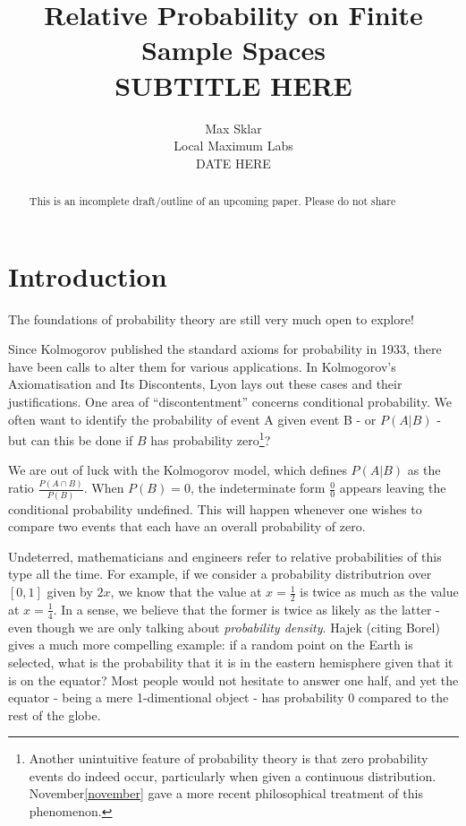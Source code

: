\documentclass[twoside]{article}
\newcommand{\quotes}[1]{``#1''}
\theoremstyle{plain}%
\theoremstyle{definition}
\theoremstyle{remark}
\begin{document}
\parindent=0in
\parskip=12pt


\title{
  Relative Probability on Finite Sample Spaces \\
  \large{
    SUBTITLE HERE
  }
}

\author{Max Sklar\\ Local Maximum Labs \\ DATE HERE}
\date{}

\maketitle
\thispagestyle{empty}

\begin{abstract}
This is an incomplete draft/outline of an upcoming paper. Please do not share
\end{abstract}

\tableofcontents
\newpage

\section{Introduction}

The foundations of probability theory are still very much open to explore!

Since Kolmogorov published the standard axioms for probability\cite{kolmogorov} in 1933, there have been calls to alter them for various applications. In Kolmogorov's Axiomatisation and Its Discontents\cite{lyon}, Lyon lays out these cases and their justifications.
One area of \quotes{discontentment} concerns conditional probability. We often want to identify the probability of event A given event B - or \(P(A|B)\) - but can this be done if \(B\) has probability zero\footnote{Another unintuitive feature of probability theory is that zero probability events do indeed occur, particularly when given a continuous distribution. November\ref{november} gave a more recent philosophical treatment of this phenomenon.}?

We are out of luck with the Kolmogorov model, which defines \(P(A|B)\) as the ratio \(\frac{P(A \cap B)}{P(B)}\). When \(P(B) = 0\), the indeterminate form \(\frac{0}{0}\) appears leaving the conditional probability undefined. This will happen whenever one wishes to compare two events that each have an overall probability of zero.

Undeterred, mathematicians and engineers refer to relative probabilities of this type all the time. For example, if we consider a probability distributrion over \([0, 1]\) given by \(2x\), we know that the value at \(x = \frac{1}{2}\) is twice as much as the value at \(x = \frac{1}{4}\). In a sense, we believe that the former is twice as likely as the latter - even though we are only talking about \textit{probability density}. Hajek\cite{hajek} (citing Borel) gives a much more compelling example: if a random point on the Earth is selected, what is the probability that it is in the eastern hemisphere given that it is on the equator? Most people would not hesitate to answer one half, and yet the equator - being a mere 1-dimentional object - has probability 0 compared to the rest of the globe.
\end{document}
